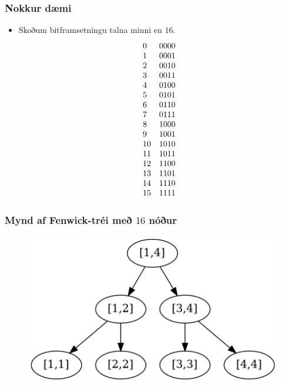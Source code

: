\documentclass{beamer}
\begin{document}
\begin{frame}
	\frametitle{Nokkur dæmi}
	\begin{itemize}
		\item<1-> Skoðum bitframsetningu talna minni en $16$.
			\small
			\[
				\begin{array}{l l}
					0 &  0000\\
					1 &  0001\\
					2 &  0010\\
					3 &  0011\\
					4 &  0100\\
					5 &  0101\\
					6 &  0110\\
					7 &  0111\\
					8 &  1000\\
					9 &  1001\\
					10 & 1010\\
					11 & 1011\\
					12 & 1100\\
					13 & 1101\\
					14 & 1110\\
					15 & 1111\\
			\end{array}
			\]
	\end{itemize}
\end{frame}

\begin{frame}
\frametitle{Mynd af Fenwick-tréi með $16$ nóður}
	\begin{figure}
		\includegraphics[scale=0.3]{mynd2.png}
	\end{figure}
\end{frame}
\end{document}
